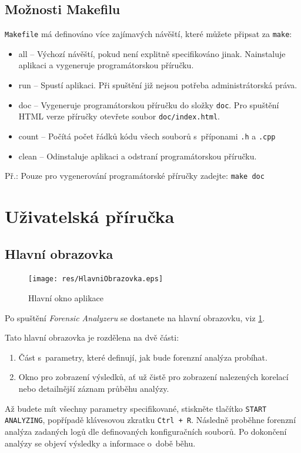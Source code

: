 \documentclass[thesis=B,czech]{FITthesis}[2012/06/26]
\begin{document}
\subsection{Možnosti Makefilu}
\label{makefile}
\texttt{Makefile} má definováno více zajímavých návěští, které můžete připsat za \texttt{make}:
\begin{itemize}
	\item all -- Výchozí návěští, pokud není explitně specifikováno jinak. Nainstaluje aplikaci a vygeneruje programátorskou příručku.
	\item run -- Spustí aplikaci. Při spuštění již nejsou potřeba administrátorská práva.
	\item doc -- Vygeneruje programátorskou příručku do složky \texttt{doc}. Pro spuštění HTML verze příručky otevřete soubor \texttt{doc/index.html}.
	\item count -- Počítá počet řádků kódu všech souborů s~příponami \texttt{.h} a \texttt{.cpp}
	\item clean -- Odinstaluje aplikaci a odstraní programátorskou příručku.
\end{itemize}

Př.:
Pouze pro vygenerování programátorské příručky zadejte: \texttt{make doc}

\section{Uživatelská příručka}
\subsection{Hlavní obrazovka}
\begin{figure}[h]
  \centering
  \texttt{[image: res/HlavniObrazovka.eps]}
  \caption{Hlavní okno aplikace}
  \label{fig:HlavniOkno}
\end{figure}

Po spuštění \textit{Forensic Analyzeru} se dostanete na hlavní obrazovku, viz \ref{fig:HlavniOkno}.

Tato hlavní obrazovka je rozdělena na dvě části:
\begin{enumerate}
	\item Část s~parametry, které definují, jak bude forenzní analýza probíhat.
	\item Okno pro zobrazení výsledků, ať už čistě pro zobrazení nalezených korelací nebo detailnější záznam průběhu analýzy.
\end{enumerate}

Až budete mít všechny parametry specifikované, stiskněte tlačítko \texttt{START ANALYZING}, popřípadě klávesovou zkratku \texttt{Ctrl + R}. Následně proběhne forenzní analýza zadaných logů dle definovaných konfiguračních souborů. Po dokončení analýzy se objeví výsledky a informace o~době běhu.
\end{document}
